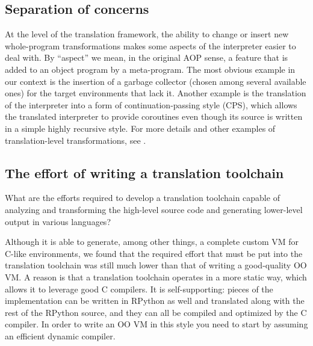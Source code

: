 \documentclass[utf8x]{llncs}
\begin{document}
\subsection{Separation of concerns}

At the level of the translation framework, the ability to change or
insert new whole-program transformations makes some aspects of the
interpreter easier to deal with.  By ``aspect'' we mean, in the original
AOP sense, a feature that is added to an object program by a
meta-program.  The most obvious example in our context is the insertion
of a garbage collector (chosen among several available ones) for the
target environments that lack it.  Another example is the translation of
the interpreter into a form of continuation-passing style (CPS), which
allows the translated interpreter to provide coroutines even though its
source is written in a simple highly recursive style.  For more details
and other examples of translation-level transformations, see
\cite{D07.1}.


\subsection{The effort of writing a translation toolchain}

What are the efforts required to develop a translation toolchain capable
of analyzing and transforming the high-level source code and generating
lower-level output in various languages?

Although it is able to generate, among other things, a complete custom
VM for C-like environments, we found that the required effort that must
be put into the translation toolchain was still much lower than that of
writing a good-quality OO VM.  A reason is that a translation toolchain
operates in a more static way, which allows it to leverage good C
compilers.  It is self-supporting: pieces of the implementation can be
written in RPython as well and translated along with the rest of the
RPython source, and they can all be compiled and optimized by the C
compiler.  In order to write an OO VM in this style you need to start by
assuming an efficient dynamic compiler.
\end{document}
